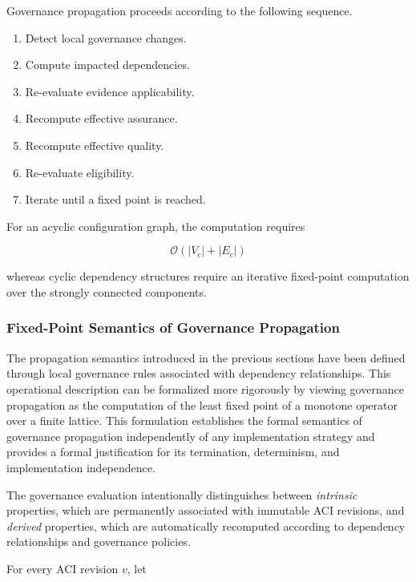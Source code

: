 \documentclass[10pt]{article}
\begin{document}
Governance propagation proceeds according to the following sequence.

\begin{enumerate}
    \item Detect local governance changes.
    \item Compute impacted dependencies.
    \item Re-evaluate evidence applicability.
    \item Recompute effective assurance.
    \item Recompute effective quality.
    \item Re-evaluate eligibility.
    \item Iterate until a fixed point is reached.
\end{enumerate}

For an acyclic configuration graph, the computation requires

\begin{equation}
\mathcal{O}
\left(
|V_c|+|E_c|
\right)
\label{eq:propagation_complexity}
\end{equation}

whereas cyclic dependency structures require an iterative fixed-point
computation over the strongly connected components.

\subsubsection{Fixed-Point Semantics of Governance Propagation}
\label{subsec:fixed_point_semantics}

The propagation semantics introduced in the previous sections have been defined
through local governance rules associated with dependency relationships. This
operational description can be formalized more rigorously by viewing governance
propagation as the computation of the least fixed point of a monotone operator
over a finite lattice. This formulation establishes the formal semantics of
governance propagation independently of any implementation strategy and
provides a formal justification for its termination, determinism, and
implementation independence.

The governance evaluation intentionally distinguishes between
\emph{intrinsic} properties, which are permanently associated with immutable
ACI revisions, and \emph{derived} properties, which are automatically
recomputed according to dependency relationships and governance policies.

For every ACI revision $v$, let
\end{document}

